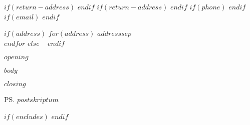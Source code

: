 \documentclass[
    foldmarks=true,      %
    foldmarks=BTm,       %
    $if(return-address)$
    fromalign=right,     %
    $else$
    fromalign=false,
    $endif$
    $if(phone)$
    fromphone,           %
    $endif$
    $if(email)$
    fromemail,           %
    $endif$
    fromlogo,            %
    version=last         %
]{scrlttr2}
\begin{document}
    $if(return-address)$
    $endif$
    $if(return-address)$
    $endif$
    $if(phone)$
    $endif$
    $if(email)$
    $endif$



    \begin{letter}{%
        $if(address)$
            $for(address)$
                $address$$sep$\\
            $endfor$
        $else$
        ~
        $endif$
    }
        \opening{$opening$}

        $body$

        \closing{$closing$}

        \ps $postskriptum$

        $if(encludes)$
        $endif$
    \end{letter}
\end{document}
